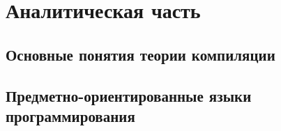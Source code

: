 \chapter{Аналитическая часть} \label{chapt1}

\section{Основные понятия теории компиляции} \label{sec11} 



 





\section{Предметно-ориентированные языки программирования} \label{sec12}

